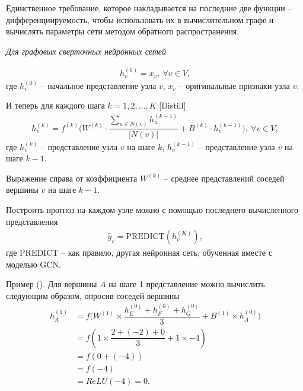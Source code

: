 \documentclass[%
	11pt,
	a4paper,
	utf8,
		]{article}
\begin{document}
Единственное требование, которое накладывается на последние две функции -- дифференциируемость, чтобы использовать их в вычислительном графе и вычислять параметры сети методом обратного распространения.

\noindent\emph{Для графовых сверточных нейронных сетей}

\begin{align*}
	h_v^{(0)} = x_v, \ \forall v \in V,
\end{align*}
где $ h_v^{(0)} $ -- начальное представление узла $ v $, $ x_v $ -- оригинальные признаки узла $ v $.

И теперь для каждого шага $ k = 1, 2, \ldots, K $ [Distill]
\begin{align*}
	h_v^{(k)} = f^{(k)} \Big( W^{(k)} \cdot \dfrac{ \sum\limits_{ u \in N(v) } h_u^{(k-1)} }{ |N(v)| } + B^{(k)} \cdot h_v^{(k-1)}\Big), \ \forall v \in V,
\end{align*}
где $ h_v^{(k)} $ -- представление узла $ v $ на шаге $ k $, $ h_v^{(k-1)} $ -- представление узла $ v $ на шаге $ k - 1 $.


Выражение справа от коэффициента $ W^{(k)} $ -- среднее представлений соседей вершины $ v $ на шаге $ k - 1 $.

Построить прогноз на каждом узле можно с помощью последнего вычисленного представления
\begin{align*}
	\hat{y}_v = \text{PREDICT}(h_v^{(K)}),
\end{align*}
где $ \text{PREDICT} $ -- как правило, другая нейронная сеть, обученная вместе с моделью GCN.


Пример (). Для вершины $ A $ на шаге 1 представление можно вычислить следующим образом, опросив соседей вершины
\begin{align*}
	h_A^{(1)} &= f\Big( W^{(1)} \times \dfrac{ h_E^{(0)} + h_F^{(0)} + h_G^{(0)} }{ 3 } + B^{(1)} \times h_A^{(0)} \Big) \\
	&= f(1 \times \dfrac{ 2 + (-2) + 0 }{ 3 } + 1 \times -4) \\
	&= f(0 + (-4)) \\
	&= f(-4) \\
	&= ReLU(-4) = 0.
\end{align*}
\end{document}
